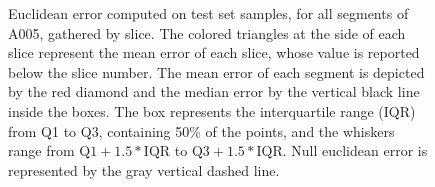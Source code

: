 \begin{figure}
\centering
{}
\caption{Euclidean error computed on test set samples, for all segments of A005, gathered by slice. The colored triangles at the side of each slice represent the mean error of each slice, whose value is reported below the slice number. The mean error of each segment is depicted by the red diamond and the median error by the vertical black line inside the boxes. The box represents the interquartile range (IQR) from Q1 to Q3, containing 50\% of the points, and the whiskers range from $\text{Q1} + 1.5 * \text{IQR}$ to $\text{Q3} + 1.5 * \text{IQR}$. Null euclidean error is represented by the gray vertical dashed line.}
\label{fig:3d_err_per_slice_seg}       %
\end{figure}

